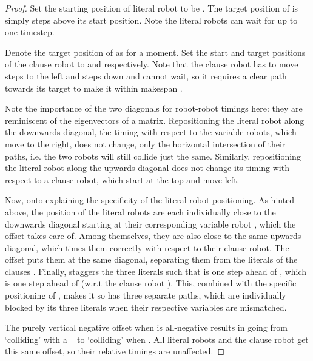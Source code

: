 \begin{proof}
	Set the starting position of literal robot  to be . The target position of  is simply  steps above its start position. Note the literal robots can wait for up to one timestep.


	Denote the target position of  as  for a moment. Set the start and target positions of the clause robot  to  and  respectively. Note that the clause robot has to move  steps to the left and  steps down and cannot wait, so it requires a clear path towards its target to make it within makespan .
	
	Note the importance of the two diagonals for robot-robot timings here: they are reminiscent of the eigenvectors of a matrix. Repositioning the literal robot along the downwards \diagdegs diagonal, the timing with respect to the variable robots, which move to the right, does not change, only the horizontal intersection of their paths, i.e. the two robots will still collide just the same. Similarly, repositioning the literal robot along the upwards diagonal does not change its timing with respect to a clause robot, which start at the top and move left. 

	Now, onto explaining the specificity of the literal robot positioning. As hinted above, the position of the literal robots  are each individually close to the downwards diagonal starting at their corresponding variable robot , which the offset  takes care of. Among themselves, they are also close to the same upwards diagonal, which times them correctly with respect to their clause robot. The offset  puts them at the same diagonal, separating them from the literals of the clauses . Finally,  staggers the three literals such that  is one step ahead of , which is one step ahead of  (w.r.t the clause robot ). This, combined with the specific positioning of , makes it so  has three separate paths, which are individually blocked by its three literals when their respective variables are mismatched.

	The purely vertical negative offset \ilmath{\phi} when  is all-negative results in  going from `colliding' with a \false\  to `colliding' when . All literal robots  and the clause robot  get this same offset, so their relative timings are unaffected.
	

\end{proof}
